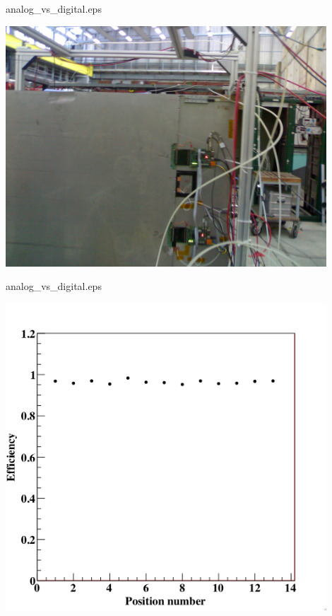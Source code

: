 \documentclass[10pt]{beamer}
\begin{document}
\begin{frame}{analog\_vs\_digital.eps}
    \centerline{\includegraphics[width=0.9\textwidth]{images/Test1m2Photo}}
\end{frame}
\begin{frame}{analog\_vs\_digital.eps}
    \centerline{\includegraphics[width=0.9\textwidth]{images/Test1m2Efficiency}}
\end{frame}
\end{document}
